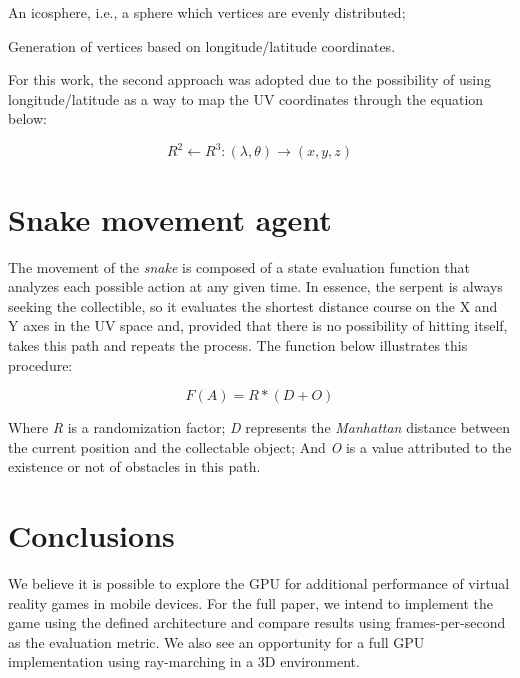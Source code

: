 \documentclass[12pt]{article}
\begin{document}
\begin{enumerate}
  \begin{item} An icosphere, i.e., a sphere which vertices are evenly distributed;
 \end{item}
  \begin{item} Generation of vertices based on longitude/latitude coordinates. \end{item}
\end{enumerate}

For this work, the second approach was adopted due to the possibility of using longitude/latitude as a way to map the UV coordinates through the equation below:

\begin{equation}
R^2 \leftarrow R^3 : (\lambda, \theta) \rightarrow (x, y, z)
\label{equation1}
\end{equation}

\section{Snake movement agent} \label{sec:agent}

The movement of the \textit{snake} is composed of a state evaluation function that analyzes each possible action at any given time. In essence, the serpent is always seeking  the collectible, so it evaluates the shortest distance course on the X and Y axes in the UV space and, provided that there is no possibility of hitting itself, takes this path and repeats the process. The function below illustrates this procedure:

\begin{equation}
F(A) = R * (D + O)
\label{equation11}
\end{equation}

Where \textit{R} is a randomization factor; \textit{D} represents the \textit{Manhattan} distance between the current position and the collectable object; And \textit{O} is a value attributed to the existence or not of obstacles in this path.

\section{Conclusions}
We believe it is possible to explore the GPU for additional performance of virtual reality games in mobile devices. For the full paper, we intend to implement the game using the defined architecture and compare results using frames-per-second as the evaluation metric. We also see an opportunity for a full GPU implementation using ray-marching in a 3D environment.



\end{document}
